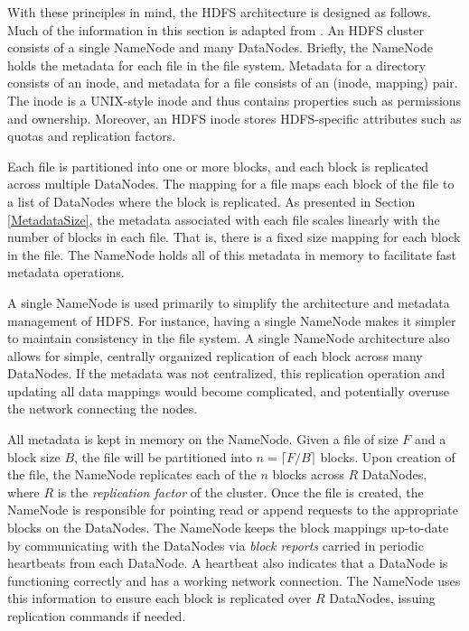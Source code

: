 \documentclass[11pt, a4paper]{article}
\begin{document}
\begin{multicols*}{2}
With these principles in mind, the HDFS architecture is designed as follows. Much of the information in this section is adapted from \cite{HdfsArch}. An HDFS cluster consists of a single NameNode and many DataNodes. Briefly, the NameNode holds the metadata for each file in the file system. Metadata for a directory consists of an inode, and metadata for a file consists of an (inode, mapping) pair. The inode is a UNIX-style inode and thus contains properties such as permissions and ownership. Moreover, an HDFS inode stores HDFS-specific attributes such as quotas and replication factors.

Each file is partitioned into one or more blocks, and each block is replicated across multiple DataNodes. The mapping for a file maps each block of the file to a list of DataNodes where the block is replicated. As presented in Section \ref{MetadataSize}, the metadata associated with each file scales linearly with the number of blocks in each file. That is, there is a fixed size mapping for each block in the file. The NameNode holds all of this metadata in memory to facilitate fast metadata operations.

A single NameNode is used primarily to simplify the architecture and metadata management of HDFS. For instance, having a single NameNode makes it simpler to maintain consistency in the file system. A single NameNode architecture also allows for simple, centrally organized replication of each block across many DataNodes. If the metadata was not centralized, this replication operation and updating all data mappings would become complicated, and potentially overuse the network connecting the nodes.

All metadata is kept in memory on the NameNode. Given a file of size $F$ and a block size $B$, the file will be partitioned into $n = \lceil F/B\rceil$ blocks. Upon creation of the file, the NameNode replicates each of the $n$ blocks across $R$ DataNodes, where $R$ is the \textit{replication factor} of the cluster. Once the file is created, the NameNode is responsible for pointing read or append requests to the appropriate blocks on the DataNodes. The NameNode keeps the block mappings up-to-date by communicating with the DataNodes via \textit{block reports} carried in periodic heartbeats from each DataNode. A heartbeat also indicates that a DataNode is functioning correctly and has a working network connection. The NameNode uses this information to ensure each block is replicated over $R$ DataNodes, issuing replication commands if needed.


\end{multicols*}
\end{document}

